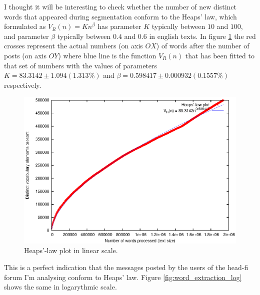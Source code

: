       I thought it will be interesting to check whether the number of new distinct words that appeared during segmentation conform to the Heaps' law, which formulated as $V_R(n) = Kn^\beta$ has parameter $K$ typically between $10$ and $100$, and parameter $\beta$ typically between $0.4$ and $0.6$ in english texts. In figure \ref{fig:word_extraction} the red crosses represent the actual numbers (on axis $OX$) of words after the number of posts (on axis $OY$) where blue line is the function $V_R(n)$ that has been fitted to that set of numbers with the values of parameters $K = 83.3142 \pm1.094 (1.313\%)$ and $\beta = 0.598417 \pm0.000932 (0.1557\%)$ respectively. 
      
      \begin{figure}[H]
        \centering
        \includegraphics[width=\textwidth]{chapters/03_implementation/extraction}
        \caption{Heaps'-law plot in linear scale.}
        \label{fig:word_extraction}
      \end{figure}
      
      This is a perfect indication that the messages posted by the users of the head-fi forum I'm analysing conform to Heaps' law. Figure \ref{fig:word_extraction_log} shows the same in logarythmic scale.
      
